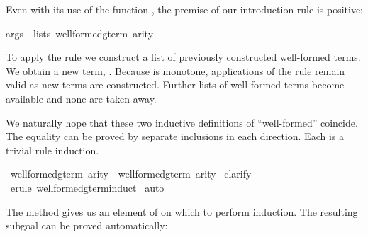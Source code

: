 \begin{isabellebody}
\begin{isamarkuptext}
Even with its use of the function , the premise of our
introduction rule is positive:
\begin{isabelle}%
args\ {}\ lists\ {}well{}formed{}gterm{}\ arity{}%
\end{isabelle}
To apply the rule we construct a list  of previously
constructed well-formed terms.  We obtain a
new term, .  Because  is monotone,
applications of the rule remain valid as new terms are constructed.
Further lists of well-formed
terms become available and none are taken away.%
%
\end{isamarkuptext}%
\isamarkuptrue%
%
\isamarkuptrue%
%
\begin{isamarkuptext}%
We naturally hope that these two inductive definitions of ``well-formed'' 
coincide.  The equality can be proved by separate inclusions in 
each direction.  Each is a trivial rule induction.%
\end{isamarkuptext}%
\isamarkuptrue%
\isamarkupfalse%
\ {}well{}formed{}gterm\ arity\ {}\ well{}formed{}gterm{}\ arity{}\isanewline
%
\isadelimproof
%
\endisadelimproof
%
\isatagproof
{}\isamarkupfalse%
\ clarify\isanewline
{}\isamarkupfalse%
\ {}erule\ well{}formed{}gterm{}induct{}\isanewline
{}\isamarkupfalse%
\ auto\isanewline
{}\isamarkupfalse%
%
\endisatagproof
{\isafoldproof}%
%
\isadelimproof
%
\endisadelimproof
%
\isadelimproof
%
\endisadelimproof
%
\isatagproof
%
\begin{isamarkuptxt}%
The  method gives
us an element of  on which to perform 
induction.  The resulting subgoal can be proved automatically:

\end{isamarkuptxt}
\end{isabellebody}
